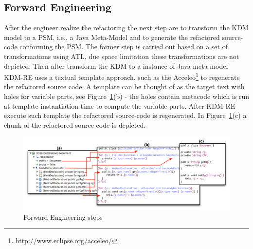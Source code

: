 \subsection{Forward Engineering}
After the engineer realize the refactoring the next step are to transform the KDM model to a PSM, i.e., a Java Meta-Model and to generate the refactored source-code conforming the PSM. The former step is carried out based on a set of transformations using ATL, due space limitation these transformations are not depicted. Then after transform the KDM to a instance of Java meta-model KDM-RE uses a textual template approach, such as the Acceleo\footnote{http://www.eclipse.org/acceleo/} to regenerate the refactored source code. A template can be thought of as the target text with holes for variable parts, see Figure~\ref{fig:forward_Engineering}(b) - the holes contain metacode which is run at template instantiation time to compute the variable parts. After KDM-RE execute such template the refactored source-code is regenerated. In Figure~\ref{fig:forward_Engineering}(c) a chunk of the refactored source-code is depicted.

\begin{figure}[!ht]
\centering
  \includegraphics[scale=0.48]{figure/Forward_Engineering2}
\caption{Forward Engineering steps}
\label{fig:forward_Engineering}
\end{figure}